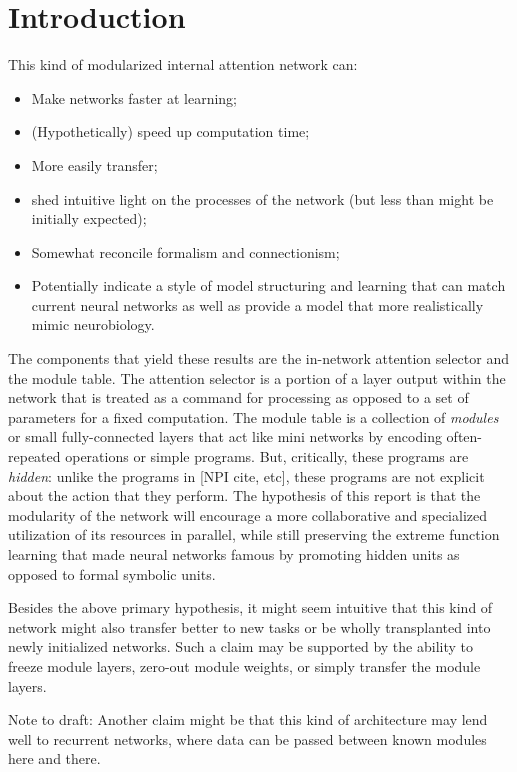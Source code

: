 \documentclass[12pt]{article}
\begin{document}
\section{Introduction}
This kind of modularized internal attention network can:
\begin{itemize}
	\item Make networks faster at learning;
	\item (Hypothetically) speed up computation time;
	\item More easily transfer;
	\item shed intuitive light on the processes of the network (but less than might be initially expected);
	\item Somewhat reconcile formalism and connectionism;
	\item Potentially indicate a style of model structuring and learning that can match current neural networks as well as provide a model that more realistically mimic neurobiology.
\end{itemize}
The components that yield these results are the in-network attention selector and the module table.  The attention selector is a portion of a layer output within the network that is treated as a command for processing as opposed to a set of parameters for a fixed computation.  The module table is a collection of \textit{modules} or small fully-connected layers that act like mini networks by encoding often-repeated operations or simple programs.  But, critically, these programs are \textit{hidden}: unlike the programs in [NPI cite, etc], these programs are not explicit about the action that they perform.  The hypothesis of this report is that the modularity of the network will encourage a more collaborative and specialized utilization of its resources in parallel, while still preserving the extreme function learning that made neural networks famous by promoting hidden units as opposed to formal symbolic units.
\par
Besides the above primary hypothesis, it might seem intuitive that this kind of network might also transfer better to new tasks or be wholly transplanted into newly initialized networks.  Such a claim may be supported by the ability to freeze module layers, zero-out module weights, or simply transfer the module layers.
\par
Note to draft: Another claim might be that this kind of architecture may lend well to recurrent networks, where data can be passed between known modules here and there.

\begin{comment}
\paragraph{Outline}
The remainder of this article is organized as follows.
Section~\ref{Model} outlines the architecture of the model.
Our new and exciting results are described in Section~\ref{results}.
Finally, Section~\ref{conclusions} gives the conclusions.
\end{comment}
\end{document}
